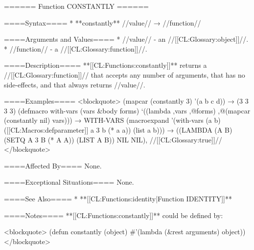 ====== Function CONSTANTLY ======

====Syntax====
  * **constantly** //value// → //function//

====Arguments and Values====
  * //value// - an //[[CL:Glossary:object]]//.
  * //function// - a //[[CL:Glossary:function]]//.

====Description====
**[[CL:Functions:constantly]]** returns a //[[CL:Glossary:function]]// that accepts any number of arguments, that has no side-effects, and that always returns //value//.

====Examples====
<blockquote> (mapcar (constantly 3) '(a b c d)) → (3 3 3 3) (defmacro with-vars (vars &body forms) `((lambda ,vars ,@forms) ,@(mapcar (constantly nil) vars))) → WITH-VARS (macroexpand '(with-vars (a b) ([[CL:Macros:defparameter]] a 3 b (* a a)) (list a b))) → ((LAMBDA (A B) (SETQ A 3 B (* A A)) (LIST A B)) NIL NIL), //[[CL:Glossary:true]]// </blockquote>

====Affected By====
None.

====Exceptional Situations====
None.

====See Also====
  * **[[CL:Functions:identity|Function IDENTITY]]**

====Notes====
**[[CL:Functions:constantly]]** could be defined by:

<blockquote> (defun constantly (object) #'(lambda (&rest arguments) object)) </blockquote>



